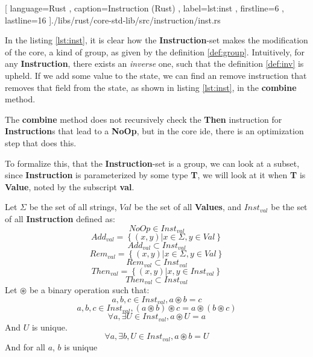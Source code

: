 \begin{code}[H]
  
   [ language=Rust
   , caption={Instruction (Rust)}
   , label=lst:inst
   , firstline=6
   , lastline=16
   ]{./libs/rust/core-std-lib/src/instruction/inst.rs}
\end{code}

In the listing \ref{lst:inst}, it is clear how the \textbf{Instruction}-set makes the
modification of the core, a kind of group, as given by the definition
\ref{def:group}. Intuitively, for any \textbf{Instruction}, there exists
an \textit{inverse} one, such that the definition \ref{def:inv} is upheld. If we
add some value to the state, we can find an remove instruction that removes
that field from the state, as shown in listing \ref{lst:inst}, in the
\textbf{combine} method.

\begin{remark}
  The \textbf{combine} method does not recursively check the \textbf{Then}
  instruction for \textbf{Instruction}s that lead to a \textbf{NoOp}, but in the
  core \gls*{ide}, there is an optimization step that does this.
\end{remark}

To formalize this, that the \textbf{Instruction}-set is a group, we can look at
a subset, since \textbf{Instruction} is parameterized by some type \textbf{T},
we will look at it when \textbf{T} is \textbf{Value}, noted by the subscript
\textbf{val}.

\begin{lemma} \label{lem:intr}
  Let $\Sigma$ be the set of all strings, $Val$ be the set of all
  \textbf{Values}, and
  $Inst_{val}$ be the set of all \textbf{Instruction} defined as:
  $$
    NoOp \in Inst_{val}
  $$
  $$
    Add_{val} = \left \{ (x, y) \vert x \in \Sigma, y \in Val \right \}
  $$
  $$
    Add_{val} \subset Inst_{val}
  $$
  $$
    Rem_{val} = \left \{ (x, y) \vert x \in \Sigma, y \in Val \right \}
  $$
  $$
    Rem_{val} \subset Inst_{val}
  $$
  $$
    Then_{val} = \left \{ (x, y) \vert x, y \in Inst_{val} \right \}
  $$
  $$
    Then_{val} \subset Inst_{val}
  $$
  Let $\circledast$ be a binary operation such that:
  $$
  a, b, c \in Inst_{val}, a \circledast b = c
  $$
  $$
  a, b, c \in Inst_{val}, \left ( a \circledast b \right ) \circledast c = a \circledast \left ( b \circledast c \right )
  $$
  $$
  \forall a, \exists U \in Inst_{val}, a \circledast U = a
  $$
  And $U$ is unique.
  $$
  \forall a, \exists b, U \in Inst_{val}, a \circledast b = U
  $$
  And for all $a$, $b$ is unique
\end{lemma}


